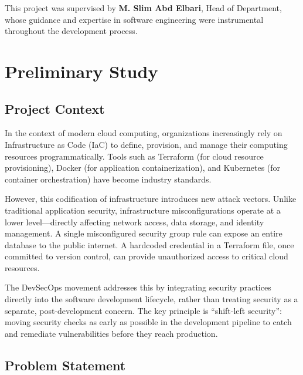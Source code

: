 This project was supervised by \textbf{M. Slim Abd Elbari}, Head of Department, whose guidance and expertise in software engineering were instrumental throughout the development process.


\section{Preliminary Study}

\subsection{Project Context}

In the context of modern cloud computing, organizations increasingly rely on Infrastructure as Code (IaC) to define, provision, and manage their computing resources programmatically. Tools such as Terraform (for cloud resource provisioning), Docker (for application containerization), and Kubernetes (for container orchestration) have become industry standards.

However, this codification of infrastructure introduces new attack vectors. Unlike traditional application security, infrastructure misconfigurations operate at a lower level—directly affecting network access, data storage, and identity management. A single misconfigured security group rule can expose an entire database to the public internet. A hardcoded credential in a Terraform file, once committed to version control, can provide unauthorized access to critical cloud resources.

The DevSecOps movement addresses this by integrating security practices directly into the software development lifecycle, rather than treating security as a separate, post-development concern. The key principle is ``shift-left security'': moving security checks as early as possible in the development pipeline to catch and remediate vulnerabilities before they reach production.

\subsection{Problem Statement}

